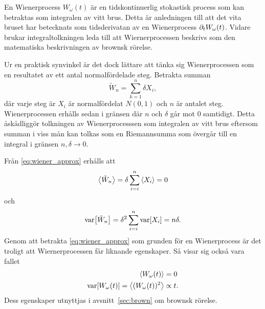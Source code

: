 
En Wienerprocess $W_\omega(t)$ är en tidskontinuerlig stokastisk process som kan betraktas som integralen av vitt brus\cite{Miller_probability2012}. Detta är anledningen till att det vita bruset har betecknats som tidsderivatan av en Wienerprocess $\partial_tW_\omega(t)$. Vidare brukar integraltolkningen leda till att Wiernerprocessen beskrivs som den matematiska beskrivningen av brownsk rörelse. 

Ur en praktisk synvinkel är det dock lättare att tänka sig Wienerprocessen som en resultatet av ett antal normalfördelade steg. Betrakta summan
\begin{equation}\label{eq:wiener_approx}
\tilde{W}_n = \sum_{k=1}^{n} \delta X_i,
\end{equation}
där varje steg är $X_i$ är normalfördelat $N(0,1)$ och $n$ är antalet steg. 
Wienerprocessen erhålls sedan i gränsen där $n$ och $\delta$ går mot $0$ samtidigt\cite{Miller_probability2012}. Detta åskådliggör tolkningen av Wienerprocesssen som integralen av vitt brus eftersom summan i viss mån kan tolkas som en Riemannsumma som övergår till en integral i gränsen $n, \delta \to 0$.

Från \eqref{eq:wiener_approx} erhålls att 
\begin{equation}
\ev{\tilde{W}_n} = \delta \sum_{i=i}^n \ev{X_i} = 0
\end{equation}
och
\begin{equation}
\text{var}\!\left[\tilde{W}_n\right] = \delta^2 \sum_{i=i}^n \text{var}\!\left[X_i\right] = n\delta.
\end{equation}
Genom att betrakta \eqref{eq:wiener_approx} som grunden för en Wienerprocess är det troligt att Wiernerprocessen får liknande egenskaper. Så visar sig också vara fallet~\cite{Miller_probability2012}
\begin{equation}
\begin{aligned}
\ev{W_\omega(t)} &= 0\\
\VAR{ W_\omega(t) } = \ev{ (W_\omega(t))^2 } &\propto t.
\end{aligned}
\end{equation}
Dess egenskaper utnyttjas i avsnitt~\ref{sec:brown} om brownsk rörelse.


